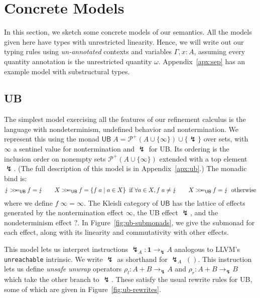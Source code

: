 \documentclass[acmsmall,screen,review]{acmart}
\newcommand{\mc}[1]{\ensuremath{\mathcal{#1}}}
\newcommand{\mb}[1]{\ensuremath{\mathbf{#1}}}
\newcommand{\ms}[1]{\ensuremath{\mathsf{#1}}}
\newcommand{\topq}{\omega}
\newcommand{\ubeff}{\lightning}
\newcommand{\obind}{\mathbin{>\!\!>\mkern-6.7mu=}}
\newcommand{\mbind}[3]{#2 \obind_{#1} #3}
\begin{document}
\section{Concrete Models}

In this section, we sketch some concrete models of our semantics. All the models given here have
types with unrestricted linearity. Hence, we will write out our typing rules using
\emph{un-annotated} contexts and variables $\Gamma, x: A$, assuming every quantity annotation is the
unrestricted quantity $\topq$. Appendix~\ref{apx:sep} has an example model with substructural types.

\subsection{UB}

The simplest model exercising all the features of our refinement calculus is the language with
nondeterminism, undefined behavior and nontermination. We represent this using the monad $\ms{UB}\;A
= \mc{P}^+(A \cup \{\infty\}) \cup \{\ubeff\}$ over sets, with $\infty$ a sentinel value for
nontermination and $\ubeff$ for UB. Its ordering is the inclusion order on nonempty sets $\mc{P}^+(A
\cup \{\infty\})$ extended with a top element $\ubeff$. (The full description of this model is in
Appendix~\ref{apx:ub}.) The monadic bind is:
$$
\mbind{\ms{UB}}{\ubeff}{f} = \ubeff \qquad
\mbind{\ms{UB}}{X}{f} = \{f\;a \mid a \in X\} \;\; \text{if } \forall a \in X, f\;a \neq \ubeff
\qquad
\mbind{\ms{UB}}{X}{f} = \ubeff \;\; \text{otherwise}
$$
where we define $f\;\infty = \infty$. 
%
The Kleisli category of $\ms{UB}$ has the lattice of effects generated by the nontermination effect
$\infty$, the UB effect $\ubeff$, and the nondeterminism effect $?$. In
Figure~\ref{fig:ub-submonads}, we give the submonad for each effect, along with its linearity and
commutativity with other effects.

This model lets us interpret instructions $\ubeff_A: \mb{1} \to_\ubeff A$ analogous to LLVM's
\texttt{unreachable} intrinsic. We write $\ubeff$ as shorthand for 
$\ubeff_A\;()$. This instruction lets us define \emph{unsafe unwrap} operators
$\rho_l : A + B \to_\ubeff A$ and $\rho_r : A + B \to_\ubeff B$
which take the other branch to $\ubeff$.
%
These satisfy the usual rewrite rules for UB, some of which are given in 
Figure~\ref{fig:ub-rewrites}.
\end{document}
